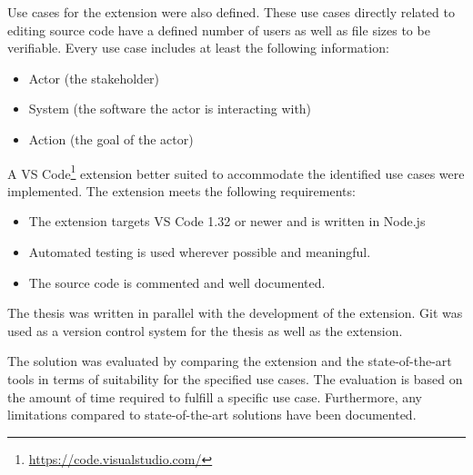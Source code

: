 Use cases for the extension were also defined. These use cases directly related to editing source code have a defined number of users as well as file sizes to be verifiable. 
Every use case includes at least the following information:
\begin{itemize}
    \item Actor (the stakeholder)
    \item System (the software the actor is interacting with)
    \item Action (the goal of the actor)
\end{itemize}
A VS Code\footnote{\href{https://code.visualstudio.com/}{https://code.visualstudio.com/}} extension better suited to accommodate the identified use cases were implemented.
The extension meets the following requirements:
\begin{itemize}
    \item The extension targets VS Code 1.32 or newer and is written in Node.js
    \item Automated testing is used wherever possible and meaningful.
    \item The source code is commented and well documented.
\end{itemize}
The thesis was written in parallel with the development of the extension. Git was used as a version control system for the thesis as well as the extension.

The solution was evaluated by comparing the extension and the state-of-the-art tools in terms of suitability for the specified use cases. 
The evaluation is based on the amount of time required to fulfill a specific use case.
Furthermore, any limitations compared to state-of-the-art solutions have been documented.